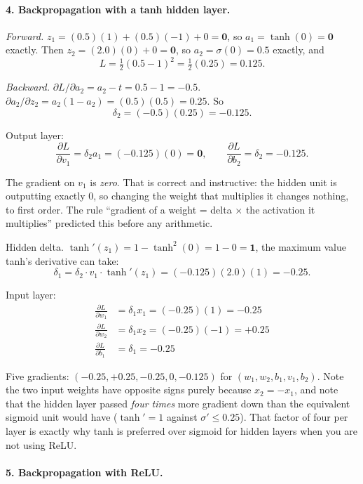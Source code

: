 \documentclass[11pt]{article}
\begin{document}
\paragraph{4. Backpropagation with a tanh hidden layer.}

\emph{Forward.} $z_1 = (0.5)(1) + (0.5)(-1) + 0 = \mathbf{0}$, so
$a_1 = \tanh(0) = \mathbf{0}$ exactly. Then $z_2 = (2.0)(0) + 0 = \mathbf{0}$,
so $a_2 = \sigma(0) = \mathbf{0.5}$ exactly, and
\[
  L = \tfrac12(0.5 - 1)^2 = \tfrac12(0.25) = \mathbf{0.125}.
\]

\emph{Backward.} $\partial L/\partial a_2 = a_2 - t = 0.5 - 1 =
\mathbf{-0.5}$. $\partial a_2/\partial z_2 = a_2(1-a_2) = (0.5)(0.5) =
\mathbf{0.25}$. So
\[
  \delta_2 = (-0.5)(0.25) = \mathbf{-0.125}.
\]

Output layer:
\[
  \frac{\partial L}{\partial v_1} = \delta_2 a_1 = (-0.125)(0)
  = \mathbf{0}, \qquad
  \frac{\partial L}{\partial b_2} = \delta_2 = \mathbf{-0.125}.
\]

The gradient on $v_1$ is \emph{zero}. That is correct and instructive: the
hidden unit is outputting exactly $0$, so changing the weight that multiplies
it changes nothing, to first order. The rule ``gradient of a weight = delta
$\times$ the activation it multiplies'' predicted this before any arithmetic.

Hidden delta. $\tanh'(z_1) = 1 - \tanh^2(0) = 1 - 0 = \mathbf{1}$, the maximum
value tanh's derivative can take:
\[
  \delta_1 = \delta_2 \cdot v_1 \cdot \tanh'(z_1)
  = (-0.125)(2.0)(1) = \mathbf{-0.25}.
\]

Input layer:
\begin{align*}
  \frac{\partial L}{\partial w_1} &= \delta_1 x_1 = (-0.25)(1)
    = \mathbf{-0.25}\\
  \frac{\partial L}{\partial w_2} &= \delta_1 x_2 = (-0.25)(-1)
    = \mathbf{+0.25}\\
  \frac{\partial L}{\partial b_1} &= \delta_1 = \mathbf{-0.25}
\end{align*}

Five gradients: $(-0.25, +0.25, -0.25, 0, -0.125)$ for
$(w_1, w_2, b_1, v_1, b_2)$. Note the two input weights have opposite signs
purely because $x_2 = -x_1$, and note that the hidden layer passed
\emph{four times} more gradient down than the equivalent sigmoid unit would
have ($\tanh' = 1$ against $\sigma' \le 0.25$). That factor of four per layer
is exactly why tanh is preferred over sigmoid for hidden layers when you are
not using ReLU.

\paragraph{5. Backpropagation with ReLU.}
\end{document}
